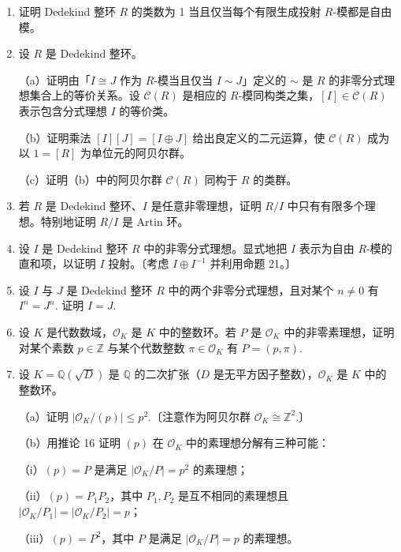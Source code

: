 \begin{enumerate}
\item 证明 Dedekind 整环 \(R\) 的类数为 1 当且仅当每个有限生成投射 \(R\)-模都是自由模。

\item 设 \(R\) 是 Dedekind 整环。

（a）证明由「\(I \cong J\) 作为 \(R\)-模当且仅当 \(I \sim J\)」定义的 \(\sim\) 是 \(R\) 的非零分式理想集合上的等价关系。设 \(\mathcal{C}(R)\) 是相应的 \(R\)-模同构类之集，\([I] \in \mathcal{C}(R)\) 表示包含分式理想 \(I\) 的等价类。

（b）证明乘法 \([I][J] = [I \oplus J]\) 给出良定义的二元运算，使 \(\mathcal{C}(R)\) 成为以 \(1 = [R]\) 为单位元的阿贝尔群。

（c）证明（b）中的阿贝尔群 \(\mathcal{C}(R)\) 同构于 \(R\) 的类群。

\item 若 \(R\) 是 Dedekind 整环、\(I\) 是任意非零理想，证明 \(R/I\) 中只有有限多个理想。特别地证明 \(R/I\) 是 Artin 环。

\item 设 \(I\) 是 Dedekind 整环 \(R\) 中的非零分式理想。显式地把 \(I\) 表示为自由 \(R\)-模的直和项，以证明 \(I\) 投射。〔考虑 \(I \oplus I^{-1}\) 并利用命题 21。〕

\item 设 \(I\) 与 \(J\) 是 Dedekind 整环 \(R\) 中的两个非零分式理想，且对某个 \(n \neq 0\) 有 \(I^n = J^n\). 证明 \(I = J\).

\item 设 \(K\) 是代数数域，\(\mathcal{O}_K\) 是 \(K\) 中的整数环。若 \(P\) 是 \(\mathcal{O}_K\) 中的非零素理想，证明对某个素数 \(p \in \mathbb{Z}\) 与某个代数整数 \(\pi \in \mathcal{O}_K\) 有 \(P = (p, \pi)\).

\item 设 \(K = \mathbb{Q}(\sqrt{D})\) 是 \(\mathbb{Q}\) 的二次扩张（\(D\) 是无平方因子整数），\(\mathcal{O}_K\) 是 \(K\) 中的整数环。

（a）证明 \(|\mathcal{O}_K/(p)| \leq p^2\).〔注意作为阿贝尔群 \(\mathcal{O}_K \cong \mathbb{Z}^2\).〕

（b）用推论 16 证明 \((p)\) 在 \(\mathcal{O}_K\) 中的素理想分解有三种可能：

（i）\((p) = P\) 是满足 \(|\mathcal{O}_K/P| = p^2\) 的素理想；

（ii）\((p) = P_1P_2\)，其中 \(P_1, P_2\) 是互不相同的素理想且 \(|\mathcal{O}_K/P_1| = |\mathcal{O}_K/P_2| = p\)；

（iii）\((p) = P^2\)，其中 \(P\) 是满足 \(|\mathcal{O}_K/P| = p\) 的素理想。


\end{enumerate}
